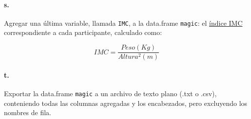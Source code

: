 \documentclass[]{article}
\begin{document}
\paragraph{s.}

Agregar una última variable, llamada \texttt{IMC}, a la data.frame
\texttt{magic}: el
\href{http://es.wikipedia.org/wiki/\%C3\%8Dndice\_de\_masa\_corporal}{índice
IMC} correspondiente a cada participante, calculado como:

\[IMC = \frac{Peso (Kg)}{Altura ^ 2 (m)}\]

\paragraph{t.}

Exportar la data.frame \texttt{magic} a un archivo de texto plano (.txt
o .csv), conteniendo todas las columnas agregadas y los encabezados,
pero excluyendo los nombres de fila.
\end{document}
